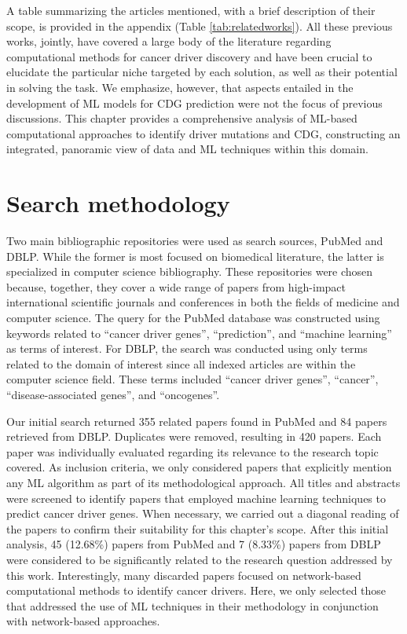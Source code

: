 A table summarizing the articles mentioned, with a brief description of their scope, is provided in the appendix (Table \ref{tab:relatedworks}). All these previous works, jointly, have covered a large body of the literature regarding computational methods for cancer driver discovery and have been crucial to elucidate the particular niche targeted by each solution, as well as their potential in solving the task. We emphasize, however, that aspects entailed in the development of ML models for CDG prediction were not the focus of previous discussions.
This chapter provides a comprehensive analysis of ML-based computational approaches to identify driver mutations and CDG, constructing an integrated, panoramic view of data and ML techniques within this domain. 


\section{Search methodology}


Two main bibliographic repositories were used as search sources, PubMed and DBLP. While the former is most focused on biomedical literature, the latter is specialized in computer science bibliography. These repositories were chosen because, together, they cover a wide range of papers from high-impact international scientific journals and conferences in both the fields of medicine and computer science. The query for the PubMed database was constructed using keywords related to ``cancer driver genes'', ``prediction'', and ``machine learning'' as terms of interest. For DBLP, the search was conducted using only terms related to the domain of interest since all indexed articles are within the computer science field. These terms included ``cancer driver genes'', ``cancer'', ``disease-associated genes'', and ``oncogenes''.

Our initial search returned 355 related papers found in PubMed and 84 papers retrieved from DBLP. Duplicates were removed, resulting in 420 papers. Each paper was individually evaluated regarding its relevance to the research topic covered. As inclusion criteria, we only considered papers that explicitly mention any ML algorithm as part of its methodological approach. All titles and abstracts were screened to identify papers that employed machine learning techniques to predict cancer driver genes. When necessary, we carried out a diagonal reading of the papers to confirm their suitability for this chapter’s scope. After this initial analysis, 45 (12.68\%) papers from PubMed and 7 (8.33\%) papers from DBLP were considered to be significantly related to the research question addressed by this work. Interestingly, many discarded papers focused on network-based computational methods to identify cancer drivers. Here, we only selected those that addressed the use of ML techniques in their methodology in conjunction with network-based approaches.

